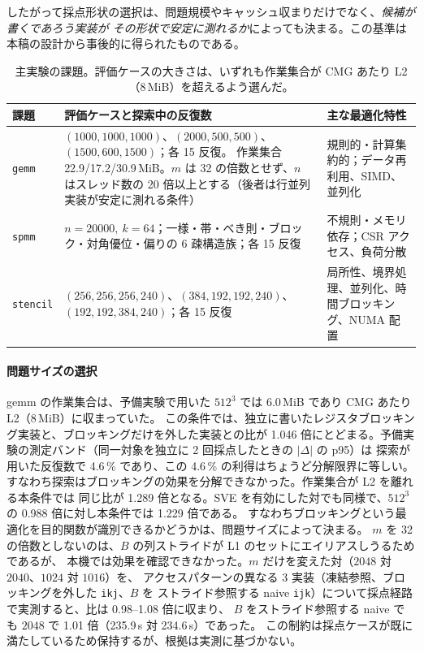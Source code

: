 \documentclass[conference,letterpaper]{IEEEtran}
\begin{document}
したがって採点形状の選択は、問題規模やキャッシュ収まりだけでなく、\emph{候補が書くであろう実装が
その形状で安定に測れるか}によっても決まる。この基準は本稿の設計から事後的に得られたものである。

\begin{table}[t]\centering\footnotesize
\caption{主実験の課題。評価ケースの大きさは、いずれも作業集合が CMG あたり L2（8\,MiB）を超えるよう選んだ。}
\label{tab:tasks}
\begin{tabular}{l>{\raggedright\arraybackslash}p{7.2cm}>{\raggedright\arraybackslash}p{3.9cm}}
\toprule
課題 & 評価ケースと探索中の反復数 & 主な最適化特性 \\
\midrule
\texttt{gemm} & $(1000,1000,1000)$、$(2000,500,500)$、$(1500,600,1500)$；各 15 反復。
  作業集合 22.9/17.2/30.9\,MiB。$m$ は 32 の倍数とせず、$n$ はスレッド数の
  20 倍以上とする（後者は行並列実装が安定に測れる条件）
  & 規則的・計算集約的；データ再利用、SIMD、並列化 \\
\texttt{spmm} & $n=20000,\ k=64$；一様・帯・べき則・ブロック・対角優位・偏りの 6 疎構造族；各 15 反復
  & 不規則・メモリ依存；CSR アクセス、負荷分散 \\
\texttt{stencil} & $(256,256,256,240)$、$(384,192,192,240)$、$(192,192,384,240)$；各 15 反復
  & 局所性、境界処理、並列化、時間ブロッキング、NUMA 配置 \\
\bottomrule
\end{tabular}
\end{table}

\paragraph{問題サイズの選択}
gemm の作業集合は、予備実験で用いた $512^3$ では 6.0\,MiB であり CMG あたり L2（8\,MiB）に収まっていた。
この条件では、独立に書いたレジスタブロッキング実装と、ブロッキングだけを外した実装との比が
1.046 倍にとどまる。予備実験の測定バンド（同一対象を独立に 2 回採点したときの $|\Delta|$ の p95）は
探索が用いた反復数で 4.6\,\% であり、この 4.6\,\% の利得はちょうど分解限界に等しい。
すなわち探索はブロッキングの効果を分解できなかった。作業集合が L2 を離れる本条件では
同じ比が 1.289 倍となる。SVE を有効にした対でも同様で、$512^3$ の 0.988 倍に対し本条件では 1.229 倍である。
すなわちブロッキングという最適化を目的関数が識別できるかどうかは、問題サイズによって決まる。
$m$ を 32 の倍数としないのは、$B$ の列ストライドが L1 のセットにエイリアスしうるためであるが、
本機では効果を確認できなかった。$m$ だけを変えた対（$2048$ 対 $2040$、$1024$ 対 $1016$）を、
アクセスパターンの異なる 3 実装（凍結参照、ブロッキングを外した \texttt{ikj}、$B$ を
ストライド参照する naive \texttt{ijk}）について採点経路で実測すると、比は 0.98--1.08 倍に収まり、
$B$ をストライド参照する naive でも $2048$ で 1.01 倍（235.9\,s 対 234.6\,s）であった。
この制約は採点ケースが既に満たしているため保持するが、根拠は実測に基づかない。
\end{document}
